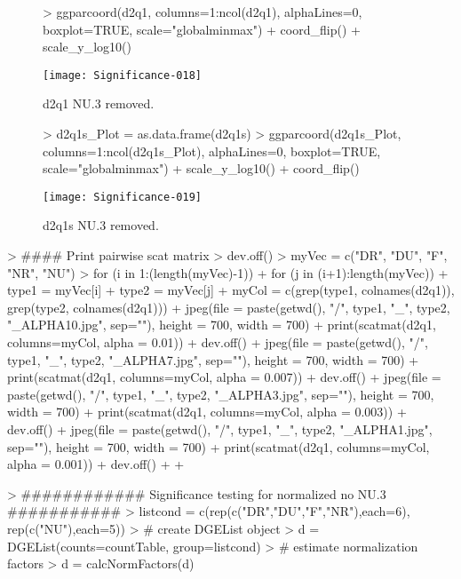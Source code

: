 \documentclass{article}
\begin{document}
\begin{figure}[H]
\centering
\begin{Schunk}
\begin{Sinput}
> ggparcoord(d2q1, columns=1:ncol(d2q1), alphaLines=0, boxplot=TRUE, scale="globalminmax") + coord_flip() + scale_y_log10()
\end{Sinput}
\end{Schunk}
\texttt{[image: Significance-018]}
\caption{d2q1 NU.3 removed.}
\label{Boxd2q1NONU3}
\end{figure}

\begin{figure}[H]
\centering
\begin{Schunk}
\begin{Sinput}
> d2q1s_Plot = as.data.frame(d2q1s)
> ggparcoord(d2q1s_Plot, columns=1:ncol(d2q1s_Plot), alphaLines=0, boxplot=TRUE, scale="globalminmax") + scale_y_log10() + coord_flip()
\end{Sinput}
\end{Schunk}
\texttt{[image: Significance-019]}
\caption{d2q1s NU.3 removed.}
\label{Boxd2q1sNONU3}
\end{figure}

\begin{Schunk}
\begin{Sinput}
> #### Print pairwise scat matrix
> dev.off()
> myVec = c("DR", "DU", "F", "NR", "NU")
> for (i in 1:(length(myVec)-1)){
+   for (j in (i+1):length(myVec)){
+     type1 = myVec[i]
+     type2 = myVec[j]
+     myCol = c(grep(type1, colnames(d2q1)), grep(type2, colnames(d2q1)))
+     jpeg(file = paste(getwd(), "/", type1, "_", type2, "_ALPHA10.jpg", sep=""), height = 700, width = 700)
+     print(scatmat(d2q1, columns=myCol, alpha = 0.01))
+     dev.off()
+     jpeg(file = paste(getwd(), "/", type1, "_", type2, "_ALPHA7.jpg", sep=""), height = 700, width = 700)
+     print(scatmat(d2q1, columns=myCol, alpha = 0.007))
+     dev.off()
+     jpeg(file = paste(getwd(), "/", type1, "_", type2, "_ALPHA3.jpg", sep=""), height = 700, width = 700)
+     print(scatmat(d2q1, columns=myCol, alpha = 0.003))
+     dev.off()
+     jpeg(file = paste(getwd(), "/", type1, "_", type2, "_ALPHA1.jpg", sep=""), height = 700, width = 700)
+     print(scatmat(d2q1, columns=myCol, alpha = 0.001))
+     dev.off()    
+     }
+ }
\end{Sinput}
\end{Schunk}

\begin{Schunk}
\begin{Sinput}
> ############ Significance testing for normalized no NU.3 ###########
> listcond = c(rep(c("DR","DU","F","NR"),each=6), rep(c("NU"),each=5))
> # create DGEList object
> d = DGEList(counts=countTable, group=listcond)
> # estimate normalization factors
> d = calcNormFactors(d)
\end{Sinput}
\end{Schunk}
\end{document}
